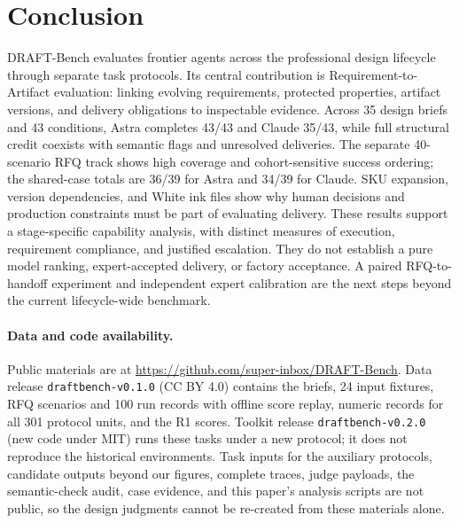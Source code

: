 \section{Conclusion}
DRAFT-Bench evaluates frontier agents across the professional design lifecycle through separate task protocols. Its central contribution is Requirement-to-Artifact evaluation: linking evolving requirements, protected properties, artifact versions, and delivery obligations to inspectable evidence. Across 35 design briefs and 43 conditions, Astra completes 43/43 and Claude 35/43, while full structural credit coexists with semantic flags and unresolved deliveries. The separate 40-scenario RFQ track shows high coverage and cohort-sensitive success ordering; the shared-case totals are 36/39 for Astra and 34/39 for Claude. SKU expansion, version dependencies, and White ink files show why human decisions and production constraints must be part of evaluating delivery. These results support a stage-specific capability analysis, with distinct measures of execution, requirement compliance, and justified escalation. They do not establish a pure model ranking, expert-accepted delivery, or factory acceptance. A paired RFQ-to-handoff experiment and independent expert calibration are the next steps beyond the current lifecycle-wide benchmark.

\paragraph{Data and code availability.}
Public materials are at \url{https://github.com/super-inbox/DRAFT-Bench}. Data release \texttt{draftbench-v0.1.0} (CC BY 4.0) contains the briefs, 24 input fixtures, RFQ scenarios and 100 run records with offline score replay, numeric records for all 301 protocol units, and the R1 scores. Toolkit release \texttt{draftbench-v0.2.0} (new code under MIT) runs these tasks under a new protocol; it does not reproduce the historical environments. Task inputs for the auxiliary protocols, candidate outputs beyond our figures, complete traces, judge payloads, the semantic-check audit, case evidence, and this paper's analysis scripts are not public, so the design judgments cannot be re-created from these materials alone.
